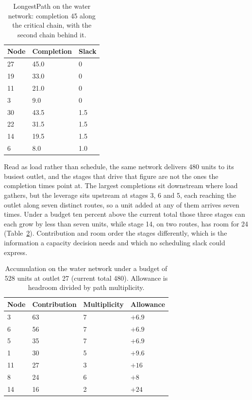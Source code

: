 \documentclass[12pt]{report}
\begin{document}
\begin{table}[htbp]
\centering
\caption{LongestPath on the water network: completion 45 along the critical
chain, with the second chain behind it.}
\label{tab:cpm-water-longest}
\small
\renewcommand{\arraystretch}{1.15}
\begin{tabular}{lll}
\toprule
Node & Completion & Slack \\
\midrule
27 & 45.0 & 0 \\
19 & 33.0 & 0 \\
11 & 21.0 & 0 \\
3 & 9.0 & 0 \\
30 & 43.5 & 1.5 \\
22 & 31.5 & 1.5 \\
14 & 19.5 & 1.5 \\
6 & 8.0 & 1.0 \\
\bottomrule
\end{tabular}
\end{table}

Read as load rather than schedule, the same network delivers 480 units to
its busiest outlet, and the stages that drive that figure are not the ones
the completion times point at. The largest completions sit downstream where
load gathers, but the leverage sits upstream at stages 3, 6 and 5, each
reaching the outlet along seven distinct routes, so a unit added at any of
them arrives seven times. Under a budget ten percent above the current
total those three stages can each grow by less than seven units, while
stage 14, on two routes, has room for 24
(Table~\ref{tab:cpm-water-allowance}). Contribution and room order the
stages differently, which is the information a capacity decision needs and
which no scheduling slack could express.

\begin{table}[htbp]
\centering
\caption{Accumulation on the water network under a budget of 528 units at
outlet 27 (current total 480). Allowance is headroom divided by path
multiplicity.}
\label{tab:cpm-water-allowance}
\small
\renewcommand{\arraystretch}{1.15}
\begin{tabular}{llll}
\toprule
Node & Contribution & Multiplicity & Allowance \\
\midrule
3 & 63 & 7 & $+6.9$ \\
6 & 56 & 7 & $+6.9$ \\
5 & 35 & 7 & $+6.9$ \\
1 & 30 & 5 & $+9.6$ \\
11 & 27 & 3 & $+16$ \\
8 & 24 & 6 & $+8$ \\
14 & 16 & 2 & $+24$ \\
\bottomrule
\end{tabular}
\end{table}
\end{document}
